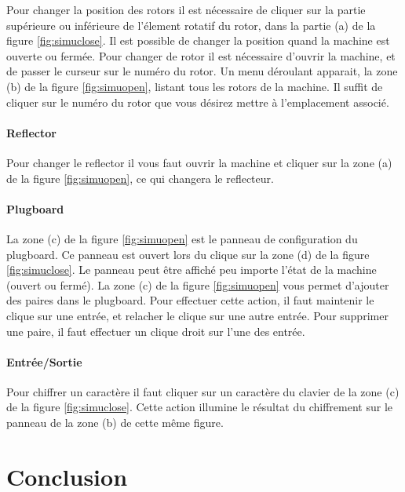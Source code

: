 \documentclass[letterpaper]{article}
\begin{document}
Pour changer la position des rotors il est nécessaire de cliquer sur la partie supérieure ou inférieure de l'élement rotatif du rotor, dans la partie (a) de la figure \ref{fig:simuclose}. Il est possible de changer la position quand la machine est ouverte ou fermée. Pour changer de rotor il est nécessaire d'ouvrir la machine, et de passer le curseur sur le numéro du rotor. Un menu déroulant apparait, la zone (b) de la figure \ref{fig:simuopen}, listant tous les rotors de la machine. Il suffit de cliquer sur le numéro du rotor que vous désirez mettre à l'emplacement associé.

\paragraph{Reflector}

Pour changer le reflector il vous faut ouvrir la machine et cliquer sur la zone (a) de la figure \ref{fig:simuopen}, ce qui changera le reflecteur.

\paragraph{Plugboard}

La zone (c) de la figure \ref{fig:simuopen} est le panneau de configuration du plugboard. Ce panneau est ouvert lors du clique sur la zone (d) de la figure \ref{fig:simuclose}. Le panneau peut être affiché peu importe l'état de la machine (ouvert ou fermé). La zone (c) de la figure \ref{fig:simuopen} vous permet d'ajouter des paires dans le plugboard. Pour effectuer cette action, il faut maintenir le clique sur une entrée, et relacher le clique sur une autre entrée. Pour supprimer une paire, il faut effectuer un clique droit sur l'une des entrée.

\paragraph{Entrée/Sortie}
Pour chiffrer un caractère il faut cliquer sur un caractère du clavier de la zone (c) de la figure \ref{fig:simuclose}. Cette action illumine le résultat du chiffrement sur le panneau de la zone (b) de cette même figure.


\section{Conclusion}

\paragraph{}
\end{document}
